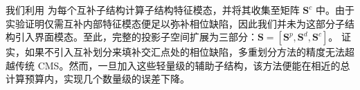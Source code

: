 我们利用 为每个互补子结构计算子结构特征模态，并将其收集至矩阵 $\mathbf{S}^c$ 中。由于实验证明仅需互补内部特征模态便足以弥补相位缺陷，因此我们并未为这部分子结构引入界面模态。至此，完整的投影子空间扩展为三部分：$\mathbf{S} = [\mathbf{S}^p, \mathbf{S}^d, \mathbf{S}^c]$。
 证实，如果不引入互补划分来填补交汇点处的相位缺陷，多重划分方法的精度无法超越传统 CMS。然而，一旦加入这些轻量级的辅助子结构，该方法便能在相近的总计算预算内，实现几个数量级的误差下降。

